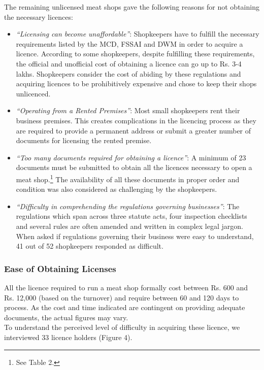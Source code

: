 \documentclass[a4paper, 12pt]{article}
\begin{document}
The remaining unlicensed meat shops gave the following reasons for not obtaining the necessary licences:

\begin{itemize}
\item \textit{“Licensing can become unaffordable”}: Shopkeepers have to fulfill the necessary requirements listed by the MCD, FSSAI and DWM in order to acquire a licence. According to some shopkeepers, despite fulfilling these requirements, the official and unofficial cost of obtaining a licence can go up to Rs. 3-4 lakhs. Shopkeepers consider the cost of abiding by these regulations and acquiring licences to be prohibitively expensive and chose to keep their shops unlicenced.
\item \textit{“Operating from a Rented Premises”}: Most small shopkeepers rent their business premises. This creates complications in the licencing process as they are required to provide a permanent address or submit a greater number of documents for licensing the rented premise. 
\item \textit{“Too many documents required for obtaining a licence”}: A minimum of 23 documents must be submitted to obtain all the licences necessary to open a meat shop.\footnote{ See Table 2.} The availability of all these documents in proper order and condition was also considered as challenging by the shopkeepers.
\item \textit{“Difficulty in comprehending the regulations governing businesses”}: The regulations which span across three statute acts, four inspection checklists and several rules are often amended and written in complex legal jargon. When asked if regulations governing their business were easy to understand, 41 out of 52 shopkeepers responded as difficult.
\end{itemize}

\subsubsection{Ease of Obtaining Licenses}

All the licence required to run a meat shop formally cost between Rs. 600 and Rs. 12,000 (based on the turnover) and require between 60 and 120 days to process. As the cost and time indicated are contingent on providing adequate documents, the actual figures may vary. \\

To understand the perceived level of difficulty in acquiring these licence, we interviewed 33 licence holders (Figure 4).\\
\end{document}
